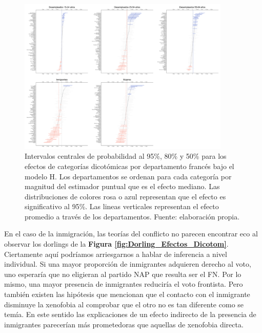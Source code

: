 \begin{figure}[h]
	\centering
	\includegraphics[width = 0.9\textwidth]{Figs/Efectos/Efectos_Dicotom_Modelo_H}
	\caption{Intervalos centrales de probabilidad al 95\%, 80\% y 50\% para los efectos de categorías dicotómicas por departamento francés bajo el modelo H. Los departamentos se ordenan para cada categoría por magnitud del estimador puntual que es el efecto mediano. Las distribuciones de colores rosa o azul representan que el efecto es significativo al 95\%. Las lineas verticales representan el efecto promedio a través de los departamentos. Fuente: elaboración propia.}
	\label{fig:Efectos_Dicotom}
\end{figure}

En el caso de la inmigración, las teorías del conflicto no parecen encontrar eco al observar los dorlings de la \textbf{Figura \ref{fig:Dorling_Efectos_Dicotom}}. Ciertamente aquí podríamos arriesgarnos a hablar de inferencia a nivel individual. Si una mayor proporción de inmigrantes adquieren derecho al voto, uno esperaría que no eligieran al partido NAP que resulta ser el FN. Por lo mismo, una mayor presencia de inmigrantes reduciría el voto frontista. Pero también existen las hipótesis que mencionan que el contacto con el inmigrante disminuye la xenofobia al comprobar que el otro no es tan diferente como se temía. En este sentido las explicaciones de un efecto indirecto de la presencia de inmigrantes parecerían más prometedoras que aquellas de xenofobia directa.\\

